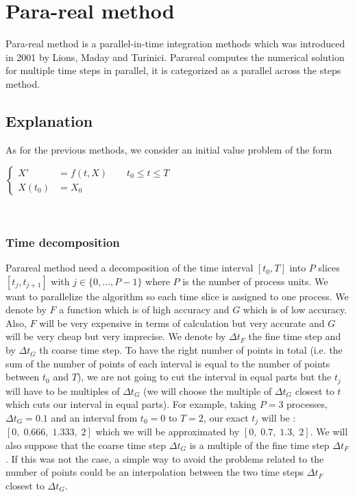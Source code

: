 \section{Para-real method}
	
Para-real method is a parallel-in-time integration methods which was introduced in 2001 by Lions, Maday and Turinici. Parareal computes the numerical solution for multiple time steps in parallel, it is categorized as a parallel across the steps method.

\subsection{Explanation}

As for the previous methods, we consider an initial value problem of the form \\
\begin{minipage}{\linewidth}
	\centering
	$\left\{\begin{aligned}
		X'&=f(t,X) \qquad t_0\le t\le T \\
		X(t_0)&=X_0
	\end{aligned}\right.$ \\
\end{minipage} \\

\subsubsection{Time decomposition}

\noindent Parareal method need a decomposition of the time interval $[t_0,T]$ into $P$ slices $[t_j,t_{j+1}]$ with  $j\in\{0,\dots,P-1\}$ where $P$ is the number of process units. We want to parallelize the algorithm so each time slice is assigned to one process. We denote by $F$ a function which is of high accuracy and $G$ which is of low accuracy. Also, $F$ will be very expensive in terms of calculation but very accurate and $G$ will be very cheap but very imprecise. We denote by $\Delta t_F$ the fine time step and by $\Delta t_G$ th coarse time step. To have the right number of points in total (i.e. the sum of the number of points of each interval is equal to the number of points between $t_0$ and $T$), we are not going to cut the interval in equal parts but the $t_j$ will have to be multiples of $\Delta t_G$ (we will choose the multiple of $\Delta t_G$ closest to $t$ which cuts our interval in equal parts).
For example, taking $P=3$ processes, $\Delta t_G=0.1$ and an interval from $t_0=0$ to $T=2$, our exact $t_j$ will be : $[0,\;0.666,\;1.333,\;2]$ which we will be approximated  by $[0,\;0.7,\;1.3,\;2]$. We will also suppose that the coarse time step $\Delta t_G$ is a multiple of the fine time step $\Delta t_F$. If this was not the case, a simple way to avoid the problems related to the number of points could be an interpolation between the two time steps $\Delta t_F$ closest to $\Delta t_G$.

